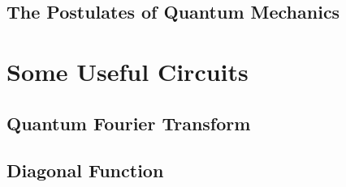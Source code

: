 \documentclass[
oneside,
11pt, a4paper,
footinclude=true,
headinclude=true,
cleardoublepage=empty
]{scrbook}
\begin{document}
\section{The Postulates of Quantum Mechanics}\label{sec:PostulatesQM}

\chapter{Some Useful Circuits}
\section{Quantum Fourier Transform}\label{sec:chapQFT}

\section{Diagonal Function}

%
\end{document}
